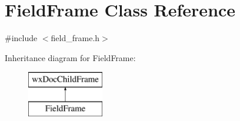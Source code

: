 \hypertarget{a00102}{\section{Field\-Frame Class Reference}
\label{a00102}
}


{\ttfamily \#include $<$field\-\_\-frame.\-h$>$}

Inheritance diagram for Field\-Frame\-:\begin{figure}[H]
\begin{center}
\leavevmode
\includegraphics[height=2.000000cm]{a00102}
\end{center}
\end{figure}
